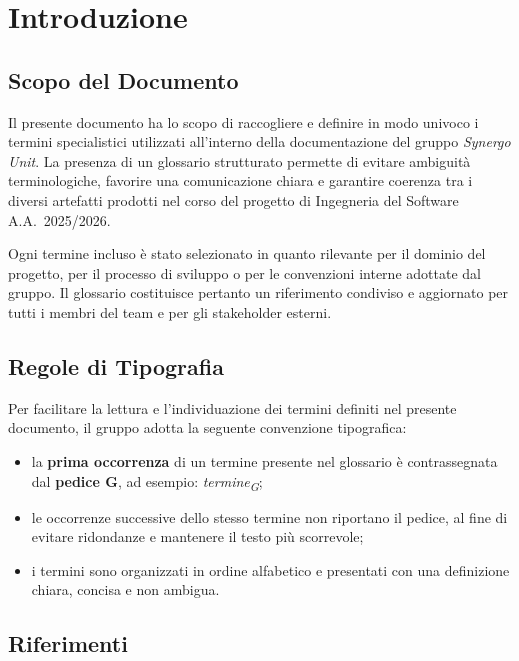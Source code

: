 \section{Introduzione}

\subsection{Scopo del Documento}
Il presente documento ha lo scopo di raccogliere e definire in modo univoco i termini
specialistici utilizzati all'interno della documentazione del gruppo \textit{Synergo Unit}.
La presenza di un glossario strutturato permette di evitare ambiguità terminologiche,
favorire una comunicazione chiara e garantire coerenza tra i diversi artefatti prodotti
nel corso del progetto di Ingegneria del Software A.A.~2025/2026.

Ogni termine incluso è stato selezionato in quanto rilevante per il dominio del progetto,
per il processo di sviluppo o per le convenzioni interne adottate dal gruppo.  
Il glossario costituisce pertanto un riferimento condiviso e aggiornato per tutti i membri
del team e per gli stakeholder esterni.

\subsection{Regole di Tipografia}
Per facilitare la lettura e l’individuazione dei termini definiti nel presente documento,
il gruppo adotta la seguente convenzione tipografica:

\begin{itemize}
    \item la \textbf{prima occorrenza} di un termine presente nel glossario è contrassegnata
    dal \textbf{pedice G}, ad esempio: \textit{termine\textsubscript{G}};
    \item le occorrenze successive dello stesso termine non riportano il pedice, al fine di
    evitare ridondanze e mantenere il testo più scorrevole;
    \item i termini sono organizzati in ordine alfabetico e presentati con una definizione
    chiara, concisa e non ambigua.
\end{itemize}

\subsection{Riferimenti}

